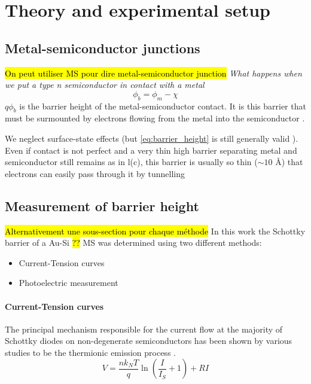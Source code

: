 \section{Theory and experimental setup}
\subsection{Metal-semiconductor junctions}
\hl{On peut utiliser MS pour dire metal-semiconductor junction}
\emph{What happens when we put a type n semiconductor in contact with a metal}
\begin{equation} \label{eq:barrier_height}
    \phi_b = \phi_m - \chi
\end{equation}
$q \phi_b$ is the barrier height of the metal-semiconductor contact.
It is this barrier that must be surmounted by electrons flowing from the metal into the semiconductor \cite{sze_physics_2007}.

We neglect surface-state effects (but \autoref{eq:barrier_height} is still generally valid \cite{sze_physics_2007}).
Even if contact is not perfect and a very
thin high barrier separating metal and semiconductor still remains as in l(c), this barrier is usually so thin ($\sim 10$ \AA) that electrons can easily pass through it by tunnelling \cite{rhoderick_physics_1970}


\subsection{Measurement of barrier height}
\hl{Alternativement une sous-section pour chaque méthode}
In this work the Schottky barrier of a Au-Si \hl{??} MS was determined using two different methods:
\begin{itemize}
    \item Current-Tension curves
    \item Photoelectric measurement
\end{itemize}


\paragraph{Current-Tension curves}
The principal mechanism responsible for the current flow at the majority of Schottky diodes on non-degenerate semiconductors has been shown by various studies to be the thermionic emission process \cite{tung_recent_2001}.
\begin{equation} \label{eq:IV-curve}
    V = \frac{n k_N T}{q} \ln \left( \frac{I}{I_S} +1 \right) + RI
\end{equation}


